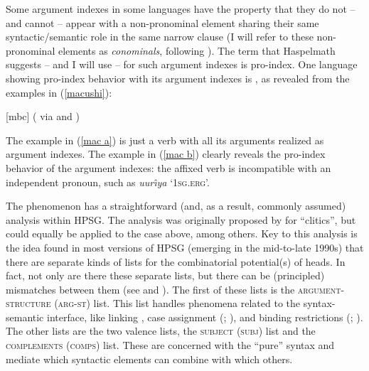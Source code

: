 \documentclass[output=paper
 	        ,biblatex
                ,babelshorthands
                ,newtxmath
                ,draftmode
                ,colorlinks, citecolor=brown
]{langscibook}
\begin{document}
\largerpage[2]
Some argument indexes in some languages have the property that they do not -- and cannot -- appear
with a non-pronominal element sharing their same syntactic/semantic role in the same narrow clause
(I will refer to these non-pronominal elements as \emph{conominals}, following \citealt[]{haspelmath13}). The term that Haspelmath suggests -- and I will use -- for such argument indexes is pro-index. One language showing pro-index behavior with its argument indexes is , as revealed from the examples in (\ref{macushi}): 
%
\begin{samepage}
\begin{exe}
\ex \label{macushi}  [mbc] (\citealt[]{abbott91} via \citealt[]{siewierska99} and \citealt[]{corbett03}) \nolistbreak
\begin{xlist}
\end{xlist}
\end{exe}
\end{samepage}
The example in (\ref{mac a}) is just a verb with all its arguments realized as argument indexes. The example in (\ref{mac b}) clearly reveals the pro-index behavior of the argument indexes: the affixed verb is incompatible with an independent pronoun, such as \textit{uur\^{\i}ya} `\textsc{1sg.erg}'. 

\largerpage[2]
The  phenomenon has a straightforward (and, as a result, commonly assumed) analysis within HPSG. The analysis was originally proposed by \citet{MS97a-u} for  ``clitics'', but could equally be applied to the  case above, among others. Key to this analysis is the idea found in most versions of HPSG (emerging in the mid-to-late 1990s) that there are separate kinds of lists for the combinatorial potential(s) of heads. In fact, not only are there these separate lists, but there can be (principled) mismatches between them (see  and ). The first of these lists is the \textsc{argument-structure} (\textsc{arg-st}) list. This list handles phenomena related to the syntax-semantic interface, like linking \citep{Davis2001a-u}, case assignment (\citealt{Meurers99b,Prze99b}; ), and binding restrictions (\citealt{mannsag98,wecharka98}; ). The other lists are the two valence lists, the \textsc{subject} (\textsc{subj}) list and the \textsc{complements} (\textsc{comps}) list. These are concerned with the ``pure'' syntax and mediate which syntactic elements can combine with which others.
\end{document}

